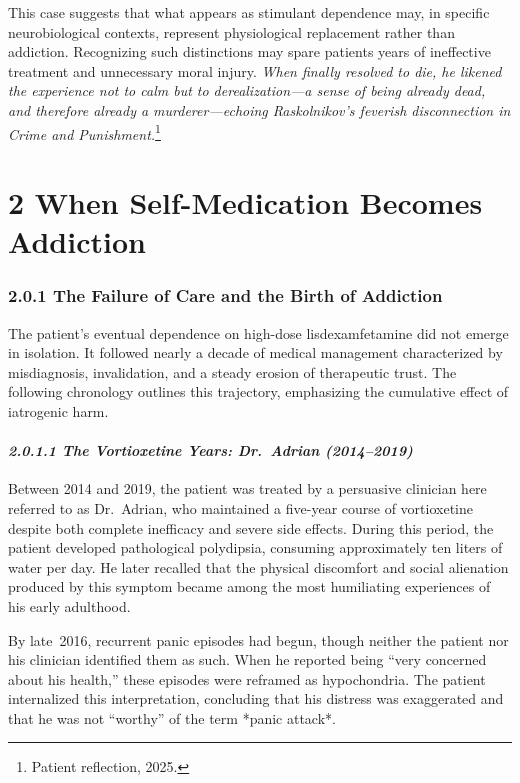 This case suggests that what appears as stimulant dependence may, in specific neurobiological contexts, represent physiological replacement rather than addiction. Recognizing such distinctions may spare patients years of ineffective treatment and unnecessary moral injury. \emph{When finally resolved to die, he likened the experience not to calm but to derealization---a sense of being already dead, and therefore already a murderer---echoing Raskolnikov's feverish disconnection in Crime and Punishment.}\footnote{Patient reflection, 2025.}

\section{2 When Self-Medication Becomes Addiction}\label{10b_traad-when-self-medication-becomes-addiction}

\subsubsection{2.0.1 The Failure of Care and the Birth of Addiction}\label{10b_traad-the-failure-of-care-and-the-birth-of-addiction}

The patient's eventual dependence on high-dose lisdexamfetamine did not emerge in isolation. It followed nearly a decade of medical management characterized by misdiagnosis, invalidation, and a steady erosion of therapeutic trust. The following chronology outlines this trajectory, emphasizing the cumulative effect of iatrogenic harm.

\paragraph{\texorpdfstring{\emph{2.0.1.1 The Vortioxetine Years: Dr.~Adrian (2014--2019)}}{2.0.1.1 The Vortioxetine Years: Dr.~Adrian (2014--2019)}}\label{10b_traad-the-vortioxetine-years-dr.-adrian-20142019}

Between 2014 and 2019, the patient was treated by a persuasive clinician here referred to as Dr.~Adrian, who maintained a five-year course of vortioxetine despite both complete inefficacy and severe side effects. During this period, the patient developed pathological polydipsia, consuming approximately ten liters of water per day. He later recalled that the physical discomfort and social alienation produced by this symptom became among the most humiliating experiences of his early adulthood.

By late~2016, recurrent panic episodes had begun, though neither the patient nor his clinician identified them as such. When he reported being ``very concerned about his health,'' these episodes were reframed as hypochondria. The patient internalized this interpretation, concluding that his distress was exaggerated and that he was not ``worthy'' of the term *panic attack*.


